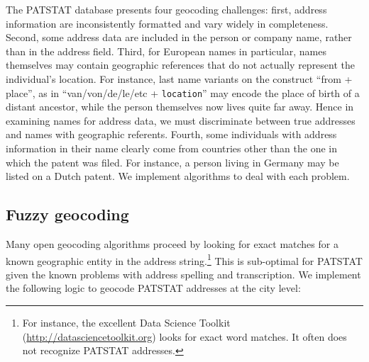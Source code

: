 \documentclass[11pt]{article}
\begin{document}
The PATSTAT database presents four geocoding challenges: first,
address information are inconsistently formatted and vary widely in
completeness. Second, some address data are included in the person or
company name, rather than in the address field. Third, for European
names in particular, names themselves may contain geographic
references that do not actually represent the individual's
location. For instance, last name variants on the construct ``from + place'', as
in ``van/von/de/le/etc +
\texttt{location}'' may encode the place of birth of a distant
ancestor, while the person themselves now lives quite far away. Hence
in examining names for address data, we must discriminate between true
addresses and names with geographic referents. Fourth, some
individuals with address information in their name clearly come from
countries other than the one in which the patent was filed. For
instance, a person living in Germany may be listed on a Dutch patent. We
implement algorithms to deal with each problem.

\subsection{Fuzzy geocoding}
\label{sec:fuzzy-geocoding}

Many open geocoding algorithms proceed by looking for exact matches
for a known geographic entity in the address string.\footnote{For
instance, the excellent Data Science Toolkit (\url{http://datasciencetoolkit.org}) looks for exact
word matches. It often does not recognize PATSTAT addresses.} This is
sub-optimal for PATSTAT given the known problems with address spelling
and transcription. We implement the following logic to geocode PATSTAT
addresses at the city level:
\end{document}
